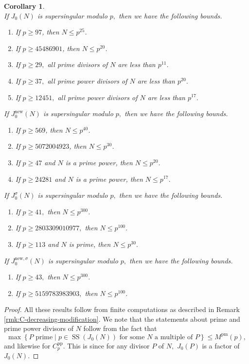 \documentclass[11pt,letterpaper,reqno]{amsart}
\newtheorem{corollary}[theorem]{Corollary}
\theoremstyle{definition}
\numberwithin{equation}{section}
\numberwithin{figure}{section}
\numberwithin{table}{section}
\newcommand{\nw}{\mathrm{new}}
\begin{document}
\begin{corollary} \label{cor:M(p)-for-sufficiently-large-p}~ \\
    If $J_0(N)$ is supersingular modulo $p,$ then we have the following bounds.
    \begin{enumerate}
        \item If $p \geq 97$, then $N \leq p^{25}$.
        \item If $p \geq 45486901$, then $N \leq p^{20}$.
        \item If $p \geq 29,$ all prime divisors of $N$ are less than $p^{11}$.
        \item If $p \geq 37,$ all prime power divisors of $N$ are less than $p^{20}$.
        \item If $p \geq 12451,$ all prime power divisors of $N$ are less than $p^{17}$.
    \end{enumerate}
    If $J_0^\nw(N)$ is supersingular modulo $p,$ then we have the following bounds.
    \begin{enumerate}
        \item If $p \geq 569$, then $N \leq p^{40}$.
        \item If $p \geq 5072004923$, then $N \leq p^{30}$.
        \item If $p \geq 47$ and $N$ is a prime power, then $N \leq p^{20}$.
        \item If $p \geq 24281$ and $N$  is a prime power, then $N \leq p^{17}$.
    \end{enumerate}
    If $J_0^\sigma(N)$ is supersingular modulo $p,$ then we have the following bounds.
    \begin{enumerate}
        \item If $p \geq 41,$ then $N \leq p^{300}$.
        \item If $p \geq 2803309010977,$ then $N \leq p^{100}$.
        \item If $p \geq 113$ and $N$ is prime, then $N \leq p^{30}.$
    \end{enumerate}
    If $J_0^{\nw, \sigma}(N)$ is supersingular modulo $p,$ then we have the following bounds.
    \begin{enumerate}
        \item If $p \geq 43,$ then $N \leq p^{300}$.
        \item If $p \geq 5159783983903,$ then $N \leq p^{100}$.
    \end{enumerate}
\end{corollary}

\begin{proof}
    All these results follow from finite computations as described in Remark \ref{rmk:C-decreasing-modification}. We note that the statements about prime and prime power divisors of $N$ follow from the fact that
    $$\max \left\{ \text{$P$ prime}  \mid \text{$p \in \operatorname{SS}\!\left(J_0(N) \right)$ for some $N$ a multiple of $P$}  \right\} \leq M^{\text{pm}}(p),$$
    and likewise for $C_p^{\text{pp}}.$ This is since for any divisor $P$ of $N,$ $J_0(P)$ is a factor of $J_0(N).$
\end{proof}
\end{document}
